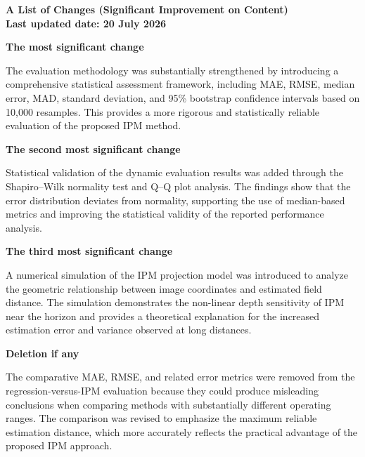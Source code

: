 \documentclass[14pt]{extarticle}
\begin{document}
\begin{center}
\textbf{A List of Changes (Significant Improvement on Content)}\\
\textbf{Last updated date: 20 July 2026}
\end{center}

\vspace{0.5em}

\noindent
\textbf{The most significant change}

The evaluation methodology was substantially strengthened by introducing a 
comprehensive statistical assessment framework, including MAE, RMSE, median error, 
MAD, standard deviation, and 95\% bootstrap confidence intervals based on 10,000 resamples. 
This provides a more rigorous and statistically reliable evaluation of the proposed IPM method.

\vspace{0.8em}

\noindent
\textbf{The second most significant change}

Statistical validation of the dynamic evaluation results was added through the 
Shapiro–Wilk normality test and Q–Q plot analysis. The findings show that the 
error distribution deviates from normality, supporting the use of median-based 
metrics and improving the statistical validity of the reported performance analysis.

\vspace{0.8em}

\noindent
\textbf{The third most significant change}

A numerical simulation of the IPM projection model was introduced to analyze the 
geometric relationship between image coordinates and estimated field distance. 
The simulation demonstrates the non-linear depth sensitivity of IPM near the horizon 
and provides a theoretical explanation for the increased estimation error and variance 
observed at long distances.

\vspace{1.2em}

\noindent
\textbf{Deletion if any}

The comparative MAE, RMSE, and related error metrics were removed from the regression-versus-IPM 
evaluation because they could produce misleading conclusions when comparing methods with substantially 
different operating ranges. The comparison was revised to emphasize the maximum reliable estimation 
distance, which more accurately reflects the practical advantage of the proposed IPM approach.
\end{document}
